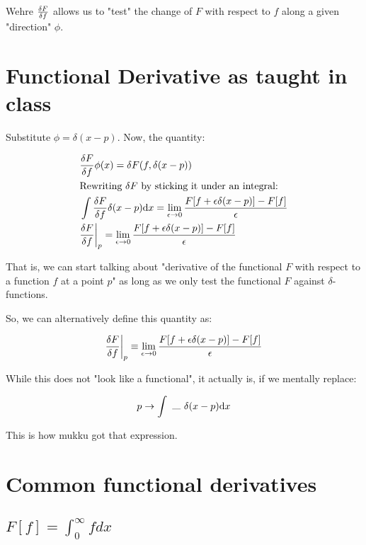 Wehre $\fdv{F}{f}$ allows us to "test" the change of $F$ with respect to $f$
along a given "direction" $\phi$.

\section{Functional Derivative as taught in class}

Substitute $\phi = \delta (x - p)$. Now, the quantity:

\begin{align*}
    &\fdv{F}{f}(x) \phi(x) =
    \delta F (f, \delta (x - p))  \\
    &\text{Rewriting $\delta F$ by sticking it under an integral:} \\
    &\int \fdv{F}{f} (x) \delta (x - p) \dd x =  
    \lim_{\epsilon \to 0}
    \frac{F[f + \epsilon \delta (x - p)] - F[f]}{\epsilon}  \\
    & \fdv{F}{f}{\bigg \rvert_p} = 
    \lim_{\epsilon \to 0}
    \frac{F[f + \epsilon \delta (x - p)] - F[f]}{\epsilon}
\end{align*}

That is, we can start talking about "derivative of the functional $F$ with
respect to a function $f$ at a point $p$" as long as we only test the functional $F$ against
$\delta$-functions.

So, we can alternatively define this quantity as:

\begin{align*}
\fdv{F}{f}{\bigg \rvert_p} \equiv 
\lim_{\epsilon \to 0} \frac{F[f + \epsilon \delta (x - p)] - F[f]}{\epsilon}
\end{align*}

While this does not "look like a functional", it actually is, if we
mentally replace:

\begin{align*}
    p \to  \int ~\rule{0.3cm}{0.1mm}~\delta (x - p) \dd x
\end{align*}

This is how mukku got that expression.

\section{Common functional derivatives}

\subsection{$F[f] = \int_0^\infty f dx$}


